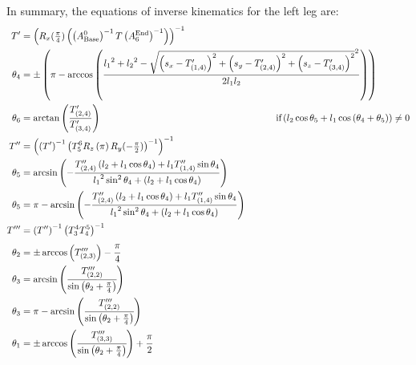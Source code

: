 In summary, the equations of inverse kinematics for the left leg are:
\begin{align*}
T' &= \left(R_x(\tfrac{\pi}{4})\left(\left(A^0_\text{Base}\right)^{-1} T \left(A^\text{End}_6\right)^{-1}\right)\right)^{-1} \\
\theta_4 &=\pm\left(\pi - \arccos\left(\frac{{l_1}^2 + {l_2}^2 - \sqrt{\left(s_x-T'_{(1,4)}\right)^2 + \left(s_y-T'_{(2,4)}\right)^2 + \left(s_z-T'_{(3,4)}\right)^2}^2}{2 l_1 l_2}\right)\right) \\
\theta_6 &= \arctan\left(\frac{T'_{(2,4)}}{T'_{(3,4)}}\right)\hspace{6.5cm}\text{if} \left(l_2\cos\theta_5 + l_1 \cos\left(\theta_4 + \theta_5\right)\right) \neq 0 \\
T'' &= \left(\left(T'\right)^{-1}\left(T^6_5R_z\left(\pi\right)R_y(-\tfrac{\pi}{2})\right)^{-1}\right)^{-1} \\
\theta_5 &= \arcsin\left(-\frac{T''_{(2,4)}\left(l_2+l_1\cos\theta_4\right) + l_1T''_{(1,4)}\sin\theta_4}{{l_1}^2\sin^2\theta_4 + \left(l_2 + l_1\cos\theta_4\right)}\right) \\
\theta_5 &= \pi - \arcsin\left(-\frac{T''_{(2,4)}\left(l_2+l_1\cos\theta_4\right) + l_1T''_{(1,4)}\sin\theta_4}{{l_1}^2\sin^2\theta_4 + \left(l_2 + l_1\cos\theta_4\right)}\right) \\
T''' &= \left(T''\right)^{-1}\left(T^4_3T^5_4\right)^{-1}\\
\theta_2 &= \pm\arccos\left(T'''_{(2,3)}\right) - \cfrac{\pi}{4} \\
\theta_3 &= \arcsin\left(\cfrac{T'''_{(2,2)}}{\sin\left(\theta_2+\frac{\pi}{4}\right)}\right) \\
\theta_3 &= \pi - \arcsin\left(\cfrac{T'''_{(2,2)}}{\sin\left(\theta_2+\frac{\pi}{4}\right)}\right) \\
\theta_1 &= \pm\arccos\left(\cfrac{T'''_{(3,3)}}{\sin\left(\theta_2+\frac{\pi}{4}\right)}\right) + \cfrac{\pi}{2}
\end{align*}







